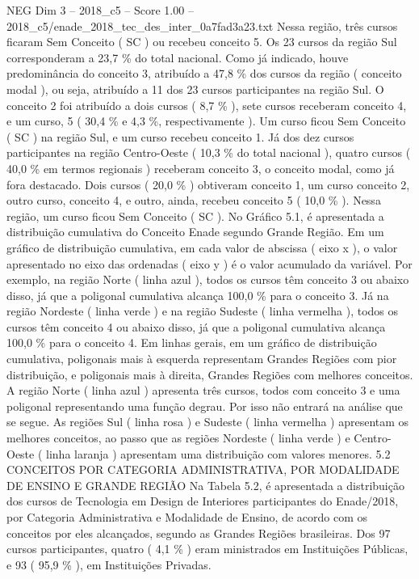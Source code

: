 \begin{textsample}{NEG Dim 3 – 2018\_c5 – Score 1.00 – 2018\_c5/enade\_2018\_tec\_des\_inter\_0a7fad3a23.txt}
Nessa região, três cursos ficaram Sem Conceito ( SC ) ou recebeu conceito 5.
Os 23 cursos da região Sul corresponderam a 23,7 \% do total nacional.
Como já indicado, houve predominância do conceito 3, atribuído a 47,8 \% dos cursos da região ( conceito modal ), ou seja, atribuído a 11 dos 23 cursos participantes na região Sul.
O conceito 2 foi atribuído a dois cursos ( 8,7 \% ), sete cursos receberam conceito 4, e um curso, 5 ( 30,4 \% e 4,3 \%, respectivamente ).
Um curso ficou Sem Conceito ( SC ) na região Sul, e um curso recebeu conceito 1.
Já dos dez cursos participantes na região Centro-Oeste ( 10,3 \% do total nacional ), quatro cursos ( 40,0 \% em termos regionais ) receberam conceito 3, o conceito modal, como já fora destacado.
Dois cursos ( 20,0 \% ) obtiveram conceito 1, um curso conceito 2, outro curso, conceito 4, e outro, ainda, recebeu conceito 5 ( 10,0 \% ).
Nessa região, um curso ficou Sem Conceito ( SC ).
No Gráfico 5.1, é apresentada a distribuição cumulativa do Conceito Enade segundo Grande Região.
Em um gráfico de distribuição cumulativa, em cada valor de abscissa ( eixo x ), o valor apresentado no eixo das ordenadas ( eixo y ) é o valor acumulado da variável.
Por exemplo, na região Norte ( linha azul ), todos os cursos têm conceito 3 ou abaixo disso, já que a poligonal cumulativa alcança 100,0 \% para o conceito 3.
Já na região Nordeste ( linha verde ) e na região Sudeste ( linha vermelha ), todos os cursos têm conceito 4 ou abaixo disso, já que a poligonal cumulativa alcança 100,0 \% para o conceito 4.
Em linhas gerais, em um gráfico de distribuição cumulativa, poligonais mais à esquerda representam Grandes Regiões com pior distribuição, e poligonais mais à direita, Grandes Regiões com melhores conceitos.
A região Norte ( linha azul ) apresenta três cursos, todos com conceito 3 e uma poligonal representando uma função degrau.
Por isso não entrará na análise que se segue.
As regiões Sul ( linha rosa ) e Sudeste ( linha vermelha ) apresentam os melhores conceitos, ao passo que as regiões Nordeste ( linha verde ) e Centro-Oeste ( linha laranja ) apresentam uma distribuição com valores menores. 5.2 CONCEITOS POR CATEGORIA ADMINISTRATIVA, POR MODALIDADE DE ENSINO E GRANDE REGIÃO Na Tabela 5.2, é apresentada a distribuição dos cursos de Tecnologia em Design de Interiores participantes do Enade/2018, por Categoria Administrativa e Modalidade de Ensino, de acordo com os conceitos por eles alcançados, segundo as Grandes Regiões brasileiras.
Dos 97 cursos participantes, quatro ( 4,1 \% ) eram ministrados em Instituições Públicas, e 93 ( 95,9 \% ), em Instituições Privadas.

\end{textsample}

